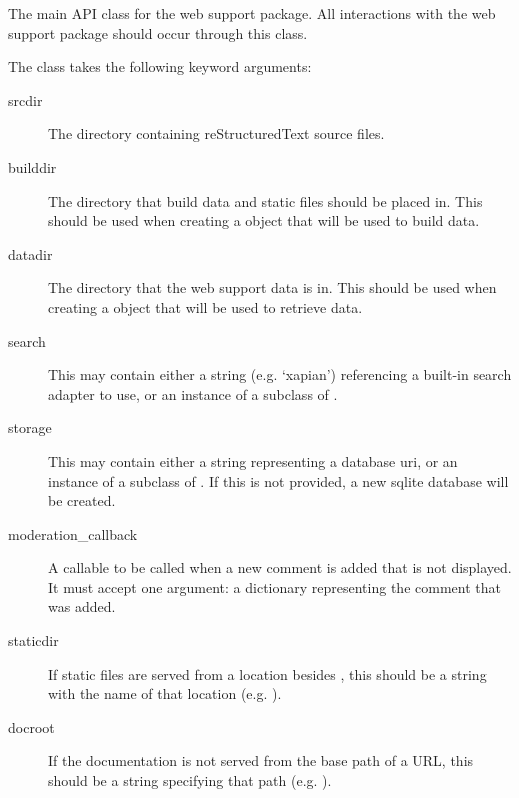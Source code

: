 \documentclass[letterpaper,10pt,english]{sphinxmanual}
\begin{document}
\begin{fulllineitems}
\label{web/api:sphinx.websupport.WebSupport}
The main API class for the web support package.  All interactions with the
web support package should occur through this class.

The class takes the following keyword arguments:
\begin{description}
\item[{srcdir}] \leavevmode
The directory containing reStructuredText source files.

\item[{builddir}] \leavevmode
The directory that build data and static files should be placed in.  This
should be used when creating a {\hyperref[web/api:sphinx.websupport.WebSupport]{}} object that will be
used to build data.

\item[{datadir}] \leavevmode
The directory that the web support data is in.  This should be used when
creating a {\hyperref[web/api:sphinx.websupport.WebSupport]{}} object that will be used to retrieve data.

\item[{search}] \leavevmode
This may contain either a string (e.g. `xapian') referencing a built-in
search adapter to use, or an instance of a subclass of
{\hyperref[web/searchadapters:sphinx.websupport.search.BaseSearch]{}}.

\item[{storage}] \leavevmode
This may contain either a string representing a database uri, or an
instance of a subclass of {\hyperref[web/storagebackends:sphinx.websupport.storage.StorageBackend]{}}.  If this is
not provided, a new sqlite database will be created.

\item[{moderation\_callback}] \leavevmode
A callable to be called when a new comment is added that is not
displayed.  It must accept one argument: a dictionary representing the
comment that was added.

\item[{staticdir}] \leavevmode
If static files are served from a location besides , this
should be a string with the name of that location
(e.g. ).

\item[{docroot}] \leavevmode
If the documentation is not served from the base path of a URL, this
should be a string specifying that path (e.g. ).

\end{description}

\end{fulllineitems}
\end{document}
